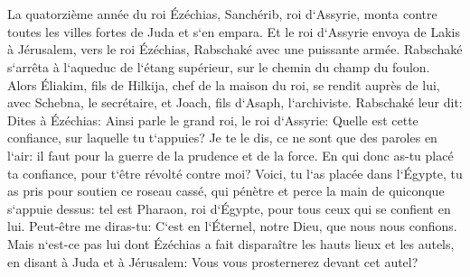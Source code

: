 \chapter{}

\verse La quatorzième année du roi Ézéchias, Sanchérib, roi d`Assyrie, monta contre toutes les villes fortes de Juda et s`en empara. 
\verse Et le roi d`Assyrie envoya de Lakis à Jérusalem, vers le roi Ézéchias, Rabschaké avec une puissante armée. Rabschaké s`arrêta à l`aqueduc de l`étang supérieur, sur le chemin du champ du foulon. 
\verse Alors Éliakim, fils de Hilkija, chef de la maison du roi, se rendit auprès de lui, avec Schebna, le secrétaire, et Joach, fils d`Asaph, l`archiviste. 
\verse Rabschaké leur dit: Dites à Ézéchias: Ainsi parle le grand roi, le roi d`Assyrie: Quelle est cette confiance, sur laquelle tu t`appuies? 
\verse Je te le dis, ce ne sont que des paroles en l`air: il faut pour la guerre de la prudence et de la force. En qui donc as-tu placé ta confiance, pour t`être révolté contre moi? 
\verse Voici, tu l`as placée dans l`Égypte, tu as pris pour soutien ce roseau cassé, qui pénètre et perce la main de quiconque s`appuie dessus: tel est Pharaon, roi d`Égypte, pour tous ceux qui se confient en lui. 
\verse Peut-être me diras-tu: C`est en l`Éternel, notre Dieu, que nous nous confions. Mais n`est-ce pas lui dont Ézéchias a fait disparaître les hauts lieux et les autels, en disant à Juda et à Jérusalem: Vous vous prosternerez devant cet autel? 
